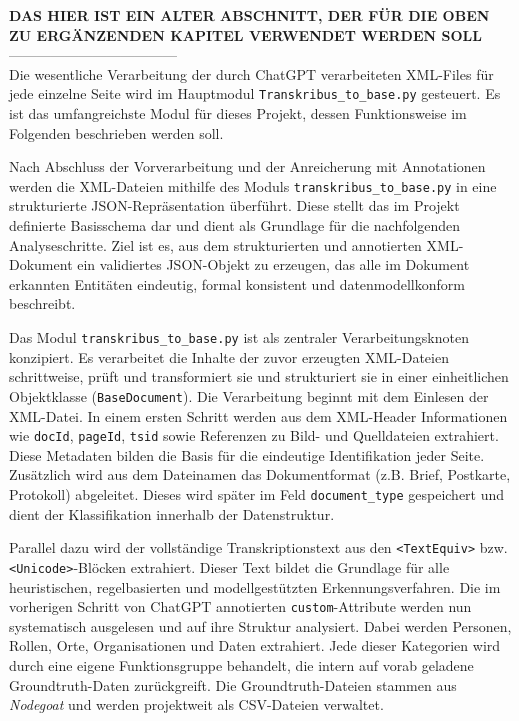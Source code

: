 \documentclass[12pt, a4paper, ngerman, bidi=default]{article}
\newcommand{\code}[1]{\colorbox{VeryLightGray}{\texttt{#1}}} %
\begin{document}
\vspace{1em}\textbf{DAS HIER IST EIN ALTER ABSCHNITT, DER FÜR DIE OBEN ZU ERGÄNZENDEN KAPITEL VERWENDET WERDEN SOLL}\\
------------------------------------\\
Die wesentliche Verarbeitung der durch ChatGPT verarbeiteten XML-Files für jede einzelne Seite wird im 
Hauptmodul \code{Transkribus\_to\_base.py} gesteuert. Es ist das umfangreichste
Modul für dieses Projekt, dessen Funktionsweise im Folgenden beschrieben werden soll.

Nach Abschluss der Vorverarbeitung und der Anreicherung mit Annotationen werden die XML-Dateien mithilfe des 
Moduls \texttt{transkribus\_to\_base.py} in eine strukturierte JSON-Repräsentation überführt. Diese stellt das 
im Projekt definierte Basisschema dar und dient als Grundlage für die nachfolgenden Analyseschritte. Ziel ist es, 
aus dem strukturierten und annotierten XML-Dokument ein validiertes JSON-Objekt zu erzeugen, das alle im Dokument 
erkannten Entitäten eindeutig, formal konsistent und datenmodellkonform beschreibt.

Das Modul \code{transkribus\_to\_base.py} ist als zentraler Verarbeitungsknoten konzipiert. Es verarbeitet die Inhalte 
der zuvor erzeugten XML-Dateien schrittweise, prüft und transformiert sie und strukturiert sie in einer einheitlichen Objektklasse 
(\code{BaseDocument}). Die Verarbeitung beginnt mit dem Einlesen der XML-Datei. In einem ersten Schritt werden aus dem XML-Header 
Informationen wie \code{docId}, \code{pageId}, \code{tsid} sowie Referenzen zu Bild- und Quelldateien extrahiert. Diese Metadaten 
bilden die Basis für die eindeutige Identifikation jeder Seite. Zusätzlich wird aus dem Dateinamen das Dokumentformat (z.B. Brief, 
Postkarte, Protokoll) abgeleitet. Dieses wird später im Feld \code{document\_type} gespeichert und dient der Klassifikation innerhalb 
der Datenstruktur.

Parallel dazu wird der vollständige Transkriptionstext aus den \code{<TextEquiv>} bzw. \code{<Unicode>}-Blöcken extrahiert. Dieser 
Text bildet die Grundlage für alle heuristischen, regelbasierten und modellgestützten Erkennungsverfahren. Die im vorherigen Schritt von 
ChatGPT annotierten \code{custom}-Attribute werden nun systematisch ausgelesen und auf ihre Struktur analysiert. Dabei werden Personen, 
Rollen, Orte, Organisationen und Daten extrahiert. Jede dieser Kategorien wird durch eine eigene Funktionsgruppe behandelt, die intern auf 
vorab geladene Groundtruth-Daten zurückgreift. Die Groundtruth-Dateien stammen aus \textit{Nodegoat} und werden projektweit als 
CSV-Dateien verwaltet.
\end{document}
